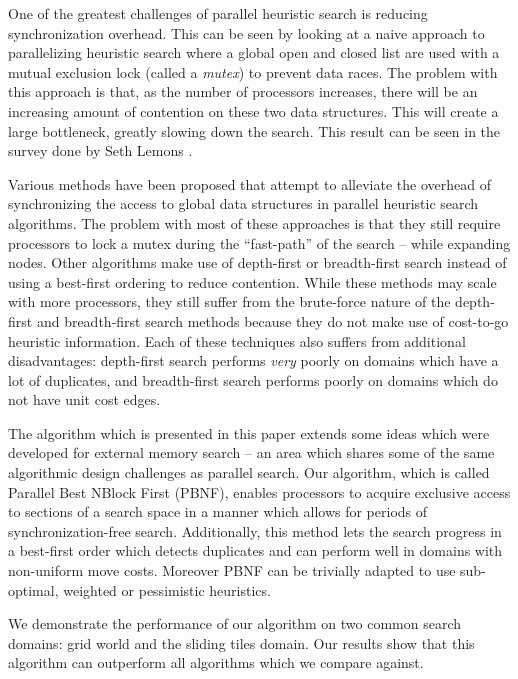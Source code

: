 \documentclass{article}
\begin{document}
 One of the greatest challenges of parallel heuristic search is
 reducing synchronization overhead.  This can be seen by looking at a
 naive approach to parallelizing heuristic search where a global open
 and closed list are used with a mutual exclusion lock (called a
 \emph{mutex}) to prevent data races.  The problem with this approach
 is that, as the number of processors increases, there will be an
 increasing amount of contention on these two data structures.  This
 will create a large bottleneck, greatly slowing down the search.  This
 result can be seen in the survey done by Seth Lemons
 \cite{lemons:sur}.

 Various methods have been proposed that attempt to alleviate the
 overhead of synchronizing the access to global data structures in
 parallel heuristic search algorithms.  The problem with most of these
 approaches is that they still require processors to lock a mutex
 during the ``fast-path'' of the search -- while expanding nodes.
 Other algorithms make use of depth-first or breadth-first search
 instead of using a best-first ordering to reduce contention.  While
 these methods may scale with more processors, they still suffer from
 the brute-force nature of the depth-first and breadth-first search
 methods because they do not make use of cost-to-go heuristic
 information.  Each of these techniques also suffers from additional
 disadvantages: depth-first search performs \emph{very} poorly on
 domains which have a lot of duplicates, and breadth-first search
 performs poorly on domains which do not have unit cost edges.

 The algorithm which is presented in this paper extends some ideas
 which were developed for external memory search -- an area which
 shares some of the same algorithmic design challenges as parallel
 search.  Our algorithm, which is called Parallel Best NBlock First
 (PBNF), enables processors to acquire exclusive access to sections of
 a search space in a manner which allows for periods of
 synchronization-free search.  Additionally, this method lets the
 search progress in a best-first order which detects duplicates and can
 perform well in domains with non-uniform move costs.  Moreover PBNF
 can be trivially adapted to use sub-optimal, weighted or pessimistic
 heuristics.

 We demonstrate the performance of our algorithm on two common search
 domains: grid world and the sliding tiles domain.  Our results show
 that this algorithm can outperform all algorithms which we compare
 against.
\end{document}
